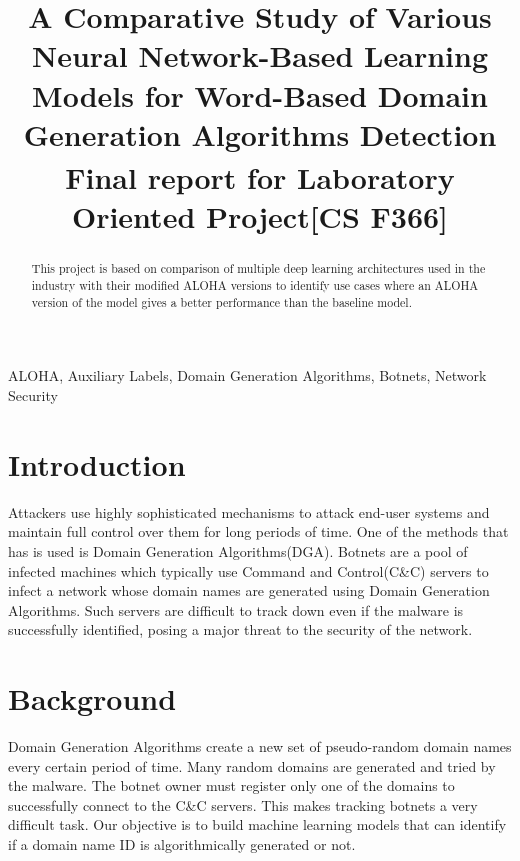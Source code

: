 \documentclass[conference]{IEEEtran}
\begin{document}
\title{A Comparative Study of Various Neural Network-Based Learning Models for Word-Based Domain Generation Algorithms Detection\\
{\footnotesize \textsuperscript{} \textbf{Final report for Laboratory Oriented Project[CS F366]}}
}

\author{
}

\maketitle

\begin{abstract}
This project is based on comparison of multiple deep learning architectures used in the industry with their modified ALOHA versions to identify use cases where an ALOHA version of the model gives a better performance than the baseline model.
\end{abstract}

\begin{IEEEkeywords}
ALOHA, Auxiliary Labels, Domain Generation Algorithms, Botnets, Network Security
\end{IEEEkeywords}

\section{Introduction}
Attackers use highly sophisticated mechanisms to attack end-user systems and maintain full
control over them for long periods of time. One of the methods that has is used is Domain Generation Algorithms(DGA). Botnets are a pool of infected machines which typically use Command and Control(C&C) servers to infect a network whose domain names are generated using Domain Generation Algorithms. Such servers are difficult to track down even if the malware is successfully identified, posing a major threat to the security of the network. 

\section{Background}
Domain Generation Algorithms create a new set of pseudo-random domain names every certain period of time. Many random domains are generated and tried by the malware. The botnet owner must register only one of the domains to successfully connect to the C&C servers. This makes tracking botnets a very difficult task. Our objective is to build machine learning models that can identify if a domain name ID is algorithmically generated or not.
\end{document}
